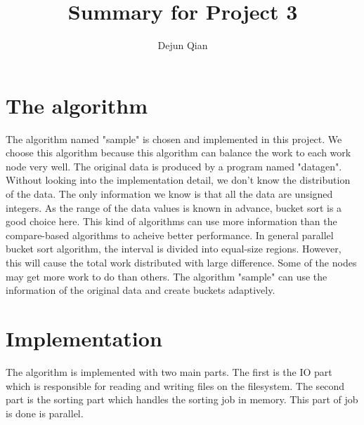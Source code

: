 \documentclass[11pt,letterpaper,oneside]{article}
\title{Summary for Project 3}
\author{Dejun Qian}
\begin{document}
\maketitle

\section{The algorithm}
The algorithm named "sample" is chosen and implemented in this project. We choose this algorithm because this algorithm can balance the work to each work node very well. The original data is produced by a program named "datagen". Without looking into the implementation detail, we don't know the distribution of the data. The only information we know is that all the data are unsigned integers. As the range of the data values is known in advance, bucket sort is a good choice here. This kind of algorithms can use more information than the compare-based algorithms to acheive better performance. In general parallel bucket sort algorithm, the interval is divided into equal-size regions. However, this will cause the total work distributed with large difference. Some of the nodes may get more work to do than others. The algorithm "sample" can use the information of the original data and create buckets adaptively.


\section{Implementation}
The algorithm is implemented with two main parts. The first is the IO part which is responsible for reading and writing files on the filesystem. The second part is the sorting part which handles the sorting job in memory. This part of job is done is parallel.
\end{document}
